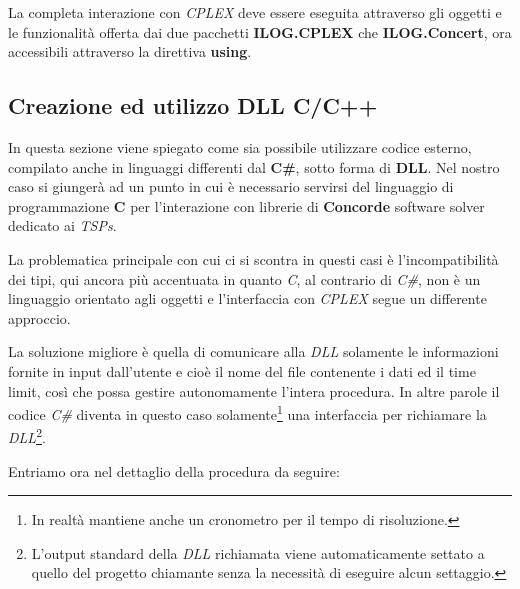 \documentclass[11pt]{article}
\begin{document}
La completa interazione con \textit{CPLEX} deve essere eseguita attraverso gli oggetti e le funzionalità offerta dai due pacchetti \textbf{ILOG.CPLEX} che \textbf{ILOG.Concert}, ora accessibili attraverso la direttiva \textbf{using}.

\subsection*{Creazione ed utilizzo DLL C/C++ }
\label{sec:CreazioneDLL}

In questa sezione viene spiegato come sia possibile utilizzare codice esterno, compilato anche in linguaggi differenti dal \textbf{C\#}, sotto forma di \textbf{DLL}. Nel nostro caso si giungerà ad un punto in cui è necessario servirsi del linguaggio di programmazione \textbf{C} per l'interazione con librerie di \textbf{Concorde} software solver dedicato ai \textit{TSPs}.

La problematica principale con cui ci si scontra in questi casi è l'incompatibilità dei tipi, qui ancora più accentuata in quanto \textit{C}, al contrario di \textit{C\#}, non è un linguaggio orientato agli oggetti e l'interfaccia con \textit{CPLEX} segue un differente approccio.

La soluzione migliore è quella di comunicare alla \textit{DLL} solamente le informazioni fornite in input dall'utente e cioè il nome del file contenente i dati ed il time limit, così che possa gestire autonomamente l'intera procedura. In altre parole il codice \textit{C\#} diventa in questo caso solamente\footnote{In realtà mantiene anche un cronometro per il tempo di risoluzione.} una interfaccia per richiamare la \textit{DLL}\footnote{L'output standard della \textit{DLL} richiamata viene automaticamente settato a quello del progetto chiamante senza la necessità di eseguire alcun settaggio.}.

Entriamo ora nel dettaglio della procedura da seguire:
\end{document}

